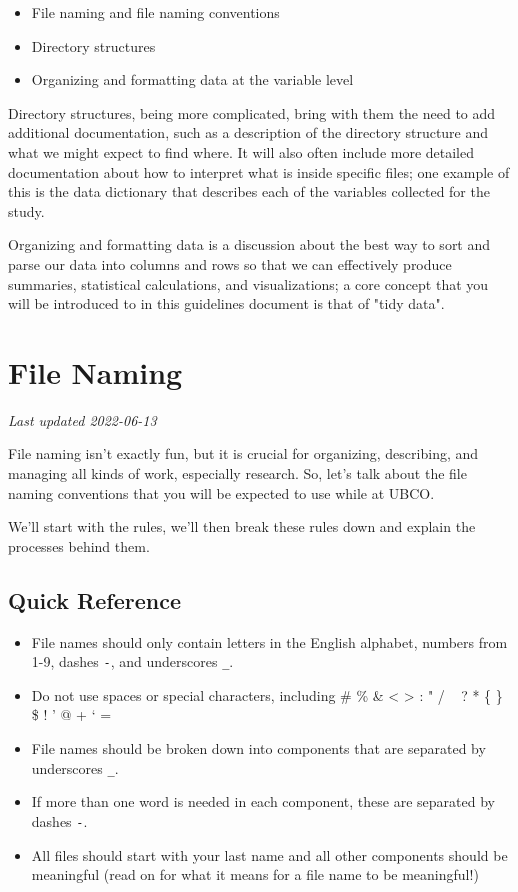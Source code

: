 \documentclass[
]{book}
\providecommand{\tightlist}{%
  \setlength{\itemsep}{0pt}\setlength{\parskip}{0pt}}
\begin{document}
\begin{itemize}
\tightlist
\item
  File naming and file naming conventions
\item
  Directory structures
\item
  Organizing and formatting data at the variable level
\end{itemize}

Directory structures, being more complicated, bring with them the need to add additional documentation, such as a description of the directory structure and what we might expect to find where. It will also often include more detailed documentation about how to interpret what is inside specific files; one example of this is the data dictionary that describes each of the variables collected for the study.

Organizing and formatting data is a discussion about the best way to sort and parse our data into columns and rows so that we can effectively produce summaries, statistical calculations, and visualizations; a core concept that you will be introduced to in this guidelines document is that of "tidy data".

\hypertarget{file-naming}{%
\chapter{File Naming}\label{file-naming}}

\emph{Last updated 2022-06-13}

File naming isn't exactly fun, but it is crucial for organizing, describing, and managing all kinds of work, especially research. So, let's talk about the file naming conventions that you will be expected to use while at UBCO.

We'll start with the rules, we'll then break these rules down and explain the processes behind them.

\hypertarget{quick-reference}{%
\section{Quick Reference}\label{quick-reference}}

\begin{itemize}
\tightlist
\item
  File names should only contain letters in the English alphabet, numbers from 1-9, dashes \texttt{-}, and underscores \texttt{\_}.
\item
  Do not use spaces or special characters, including \# \% \& \textless{} \textgreater{} : " / ~\textbar{} ? * \{ \} \$ ! ' @ + ` =
\item
  File names should be broken down into components that are separated by underscores \texttt{\_}.
\item
  If more than one word is needed in each component, these are separated by dashes \texttt{-}.
\item
  All files should start with your last name and all other components should be meaningful (read on for what it means for a file name to be meaningful!)
\end{itemize}
\end{document}
